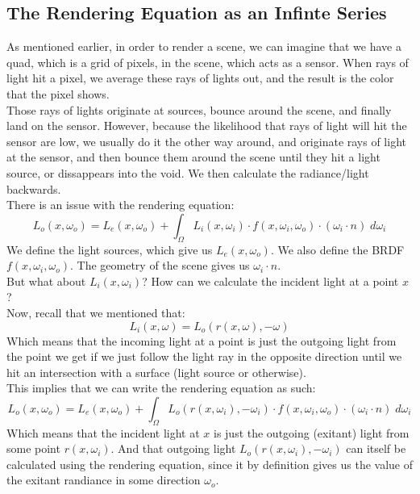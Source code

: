 \documentclass[12pt]{article}
\begin{document}
\newpage

\subsection*{The Rendering Equation as an Infinte Series}

As mentioned earlier, in order to render a scene,
we can imagine that we have a quad, which is a
grid of pixels, in the scene, which acts as
a sensor. When rays of light hit a pixel,
we average these rays of lights out,
and the result is the color that the pixel
shows. \\
Those rays of lights originate at sources, bounce
around the scene, and finally land on the sensor. 
However, because the likelihood that rays of
light will hit the sensor are low, we usually
do it the other way around,
and originate rays of light at the sensor,
and then bounce them around the scene until
they hit a light source, or dissappears into
the void.
We then calculate the radiance/light
backwards. \\

There is an issue with the rendering equation:
\[ L_{o}(x, \omega_o)
= L_{e}(x, \omega_o)
+ \int_\Omega L_{i}(x, \omega_i) \cdot
f(x, \omega_i, \omega_o) \cdot
(\omega_i \cdot n) \; d\omega_i \]
We define the light sources, 
which give us $L_{e}(x, \omega_o)$.
We also define the BRDF $f(x, \omega_i, \omega_o)$.
The geometry of the scene gives us $\omega_i \cdot n$. \\
But what about $L_{i}(x, \omega_i)$?
How can we calculate the incident light
at a point $x$? \\

Now, recall that we mentioned that:
\[ L_i(x, \omega) = L_o(r(x, \omega), -\omega) \]
Which means that the incoming light at a point
is just the outgoing light from the point
we get if we just follow the light ray
in the opposite direction until we hit
an intersection with a surface (light source
or otherwise). \\
This implies that we can write the rendering
equation as such:
\[ L_{o}(x, \omega_o)
= L_{e}(x, \omega_o)
+ \int_\Omega L_o(r(x, \omega_i), -\omega_i)  \cdot
f(x, \omega_i, \omega_o) \cdot
(\omega_i \cdot n) \; d\omega_i \]
Which means that the incident light at $x$
is just the outgoing (exitant) light 
from some point $r(x, \omega_i)$.
And that outgoing light $L_o(r(x, \omega_i), -\omega_i)$
can itself be calculated using the rendering
equation, since it by definition
gives us the value of the exitant randiance
in some direction $\omega_o$. \\
\end{document}
